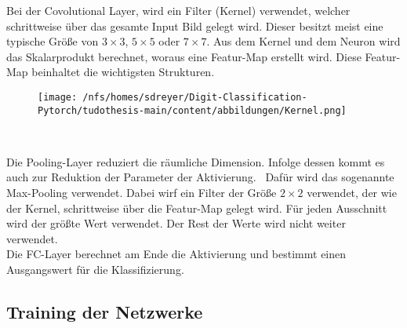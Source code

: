 Bei der Covolutional Layer, wird ein Filter (Kernel) verwendet, welcher schrittweise über das gesamte Input Bild gelegt wird.
Dieser besitzt meist eine typische Größe von $3 \times 3$, $5 \times 5$ oder $ 7 \times 7$.  
Aus dem Kernel und dem Neuron wird das Skalarprodukt berechnet, woraus eine Featur-Map erstellt wird. 
Diese Featur-Map beinhaltet die wichtigsten Strukturen.

\begin{figure}[htbp]
  \centering
  \texttt{[image: /nfs/homes/sdreyer/Digit-Classification-Pytorch/tudothesis-main/content/abbildungen/Kernel.png]}
  \caption{~\cite{Yamashita2018}}
  \label{fig:kernel}
\end{figure}

Die Pooling-Layer reduziert die räumliche Dimension. Infolge dessen kommt es auch zur Reduktion der Parameter der Aktivierung.~\cite{datascience}
Dafür wird das sogenannte Max-Pooling verwendet. Dabei wirf ein Filter der Größe $2 \times 2$ verwendet, der wie der Kernel, schrittweise über die Featur-Map gelegt wird.
Für jeden Ausschnitt wird der größte Wert verwendet. Der Rest der Werte wird nicht weiter verwendet.~\cite{Yamashita2018}\\

Die FC-Layer berechnet am Ende die Aktivierung und bestimmt einen Ausgangswert für die Klassifizierung.

\subsection{Training der Netzwerke}

